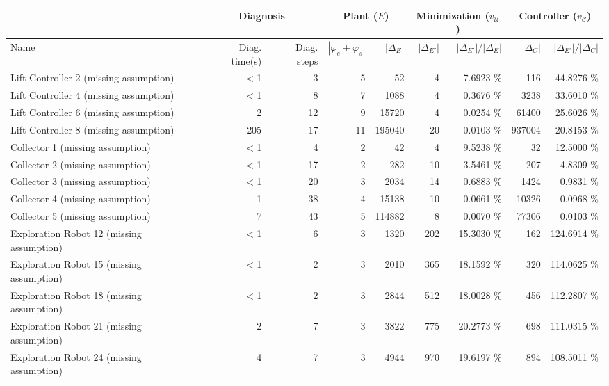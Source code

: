 \begin{tabular}{|l|rr|rr|rr|rr|}
  \hline & \multicolumn{2}{c|}{Diagnosis}&\multicolumn{2}{c|}{Plant ($E$)} & \multicolumn{2}{c|}{Minimization ($v_{\mathcal{U}}$)} & \multicolumn{2}{c|}{Controller ($v_{\mathcal{C}}$)}\\ \hline
Name & Diag. time(s) & Diag. steps & $|\varphi_e + \varphi_s|$ & $|\Delta_E|$ & $|\Delta_{E'}|$ & $|\Delta_{E'}|/|\Delta_{E}|$ & $|\Delta_{C}|$ & $|\Delta_{E'}|/|\Delta_{C}|$ \\ 
  \hline
Lift Controller 2 (missing assumption) & $<$1 & 3 & 5 & 52 & 4 &  7.6923 \% & 116 &  44.8276 \% \\ 
  Lift Controller 4 (missing assumption) & $<$1 & 8 & 7 & 1088 & 4 &  0.3676 \% & 3238 &  33.6010 \% \\ 
  Lift Controller 6 (missing assumption) & 2 & 12 & 9 & 15720 & 4 &  0.0254 \% & 61400 &  25.6026 \% \\ 
  Lift Controller 8 (missing assumption) & 205 & 17 & 11 & 195040 & 20 &  0.0103 \% & 937004 &  20.8153 \% \\ 
  Collector 1 (missing assumption) & $<$1 & 4 & 2 & 42 & 4 &  9.5238 \% & 32 &  12.5000 \% \\ 
  Collector 2 (missing assumption) & $<$1 & 17 & 2 & 282 & 10 &  3.5461 \% & 207 &   4.8309 \% \\ 
  Collector 3 (missing assumption) & $<$1 & 20 & 3 & 2034 & 14 &  0.6883 \% & 1424 &   0.9831 \% \\ 
  Collector 4 (missing assumption) & 1 & 38 & 4 & 15138 & 10 &  0.0661 \% & 10326 &   0.0968 \% \\ 
  Collector 5 (missing assumption) & 7 & 43 & 5 & 114882 & 8 &  0.0070 \% & 77306 &   0.0103 \% \\ 
  Exploration Robot 12 (missing assumption) & $<$1 & 6 & 3 & 1320 & 202 & 15.3030 \% & 162 & 124.6914 \% \\ 
  Exploration Robot 15 (missing assumption) & $<$1 & 2 & 3 & 2010 & 365 & 18.1592 \% & 320 & 114.0625 \% \\ 
  Exploration Robot 18 (missing assumption) & $<$1 & 2 & 3 & 2844 & 512 & 18.0028 \% & 456 & 112.2807 \% \\ 
  Exploration Robot 21 (missing assumption) & 2 & 7 & 3 & 3822 & 775 & 20.2773 \% & 698 & 111.0315 \% \\ 
  Exploration Robot 24 (missing assumption) & 4 & 7 & 3 & 4944 & 970 & 19.6197 \% & 894 & 108.5011 \% \\ 

\end{tabular}
